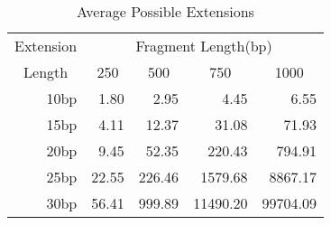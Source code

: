 \begin{table}[bth]
\caption{Average Possible Extensions}
\label{'table3'}
\begin{center}
\begin{tabular}{||r|rrrr||}  \hline
\multicolumn{1}{||c|}{Extension} & \multicolumn{4}{c||}{Fragment Length(bp)} \\ 
\multicolumn{1}{||c|}{Length} & \multicolumn{1}{c}{250} 
& \multicolumn{1}{c}{500} & \multicolumn{1}{c}{750}
& \multicolumn{1}{c||}{1000} \\ \hline
10bp &  1.80 &   2.95 &     4.45 &     6.55 \\
15bp &  4.11 &  12.37 &    31.08 &    71.93 \\
20bp &  9.45 &  52.35 &   220.43 &   794.91 \\
25bp & 22.55 & 226.46 &  1579.68 &  8867.17 \\
30bp & 56.41 & 999.89 & 11490.20 & 99704.09 \\ \hline
\end{tabular}
\end{center}
\end{table}
